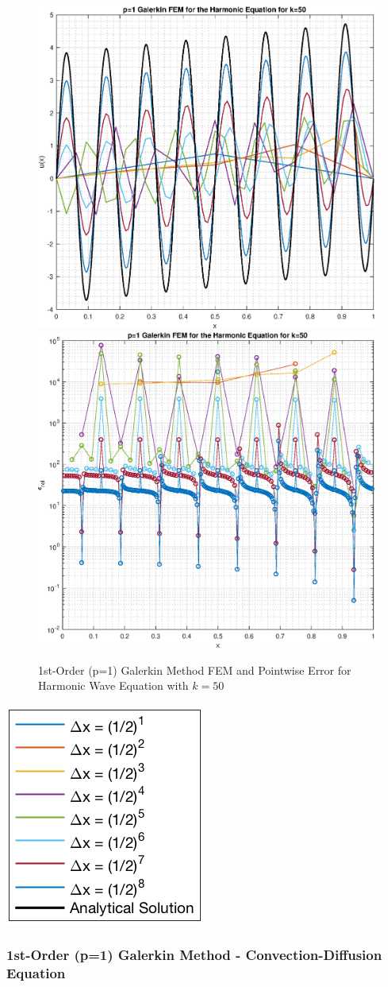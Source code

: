 \documentclass[10pt]{article}		%
\numberwithin{equation}{section}
\begin{document}
\begin{figure}[H]
	\begin{center}
		\includegraphics[width = 0.31\linewidth]{solution_harmonic_p_1_k_50}
		\includegraphics[width = 0.31\linewidth]{pointwise_error_harmonic_p_1_k_50}
		\caption{1st-Order (p=1) Galerkin Method FEM and Pointwise Error for Harmonic Wave Equation with $k = 50$}
	\end{center}
\end{figure}

\begin{center}
	\includegraphics[height = 0.10\linewidth]{legend}
\end{center}

\newpage

\subsubsection{1st-Order (p=1) Galerkin Method - Convection-Diffusion Equation}
\end{document}
